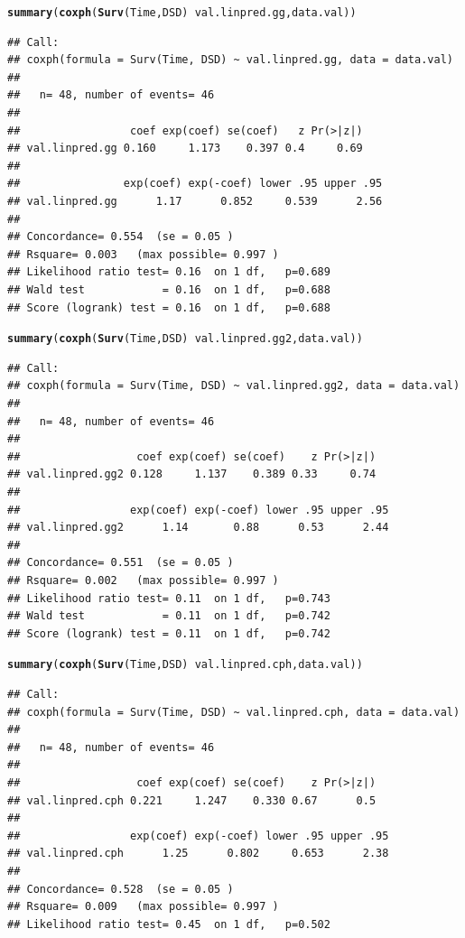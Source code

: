 \documentclass{article}\usepackage[]{graphicx}\usepackage[]{color}
\makeatletter
\newcommand{\hlopt}[1]{\textcolor[rgb]{0,0,0}{#1}}%
\newcommand{\hlstd}[1]{\textcolor[rgb]{0.345,0.345,0.345}{#1}}%
\newcommand{\hlkwd}[1]{\textcolor[rgb]{0.737,0.353,0.396}{\textbf{#1}}}%
\newenvironment{kframe}{%
 \def\at@end@of@kframe{}%
 \ifinner\ifhmode%
  \def\at@end@of@kframe{\end{minipage}}%
  \begin{minipage}{\columnwidth}%
 \fi\fi%
 \def\FrameCommand##1{\hskip\@totalleftmargin \hskip-\fboxsep
 \colorbox{shadecolor}{##1}\hskip-\fboxsep
     \hskip-\linewidth \hskip-\@totalleftmargin \hskip\columnwidth}%
 \MakeFramed {\advance\hsize-\width
   \@totalleftmargin\z@ \linewidth\hsize
   \@setminipage}}%
 {\par\unskip\endMakeFramed%
 \at@end@of@kframe}
\newenvironment{knitrout}{}{} %
\makeatother
\begin{document}
\begin{knitrout}
\begin{kframe}
\begin{alltt}
\hlkwd{summary}\hlstd{(}\hlkwd{coxph}\hlstd{(}\hlkwd{Surv}\hlstd{(Time, DSD)} \hlopt{~} \hlstd{val.linpred.gg, data.val))}
\end{alltt}
\begin{verbatim}
## Call:
## coxph(formula = Surv(Time, DSD) ~ val.linpred.gg, data = data.val)
## 
##   n= 48, number of events= 46 
## 
##                 coef exp(coef) se(coef)   z Pr(>|z|)
## val.linpred.gg 0.160     1.173    0.397 0.4     0.69
## 
##                exp(coef) exp(-coef) lower .95 upper .95
## val.linpred.gg      1.17      0.852     0.539      2.56
## 
## Concordance= 0.554  (se = 0.05 )
## Rsquare= 0.003   (max possible= 0.997 )
## Likelihood ratio test= 0.16  on 1 df,   p=0.689
## Wald test            = 0.16  on 1 df,   p=0.688
## Score (logrank) test = 0.16  on 1 df,   p=0.688
\end{verbatim}
\begin{alltt}
\hlkwd{summary}\hlstd{(}\hlkwd{coxph}\hlstd{(}\hlkwd{Surv}\hlstd{(Time, DSD)} \hlopt{~} \hlstd{val.linpred.gg2, data.val))}
\end{alltt}
\begin{verbatim}
## Call:
## coxph(formula = Surv(Time, DSD) ~ val.linpred.gg2, data = data.val)
## 
##   n= 48, number of events= 46 
## 
##                  coef exp(coef) se(coef)    z Pr(>|z|)
## val.linpred.gg2 0.128     1.137    0.389 0.33     0.74
## 
##                 exp(coef) exp(-coef) lower .95 upper .95
## val.linpred.gg2      1.14       0.88      0.53      2.44
## 
## Concordance= 0.551  (se = 0.05 )
## Rsquare= 0.002   (max possible= 0.997 )
## Likelihood ratio test= 0.11  on 1 df,   p=0.743
## Wald test            = 0.11  on 1 df,   p=0.742
## Score (logrank) test = 0.11  on 1 df,   p=0.742
\end{verbatim}
\begin{alltt}
\hlkwd{summary}\hlstd{(}\hlkwd{coxph}\hlstd{(}\hlkwd{Surv}\hlstd{(Time, DSD)} \hlopt{~} \hlstd{val.linpred.cph, data.val))}
\end{alltt}
\begin{verbatim}
## Call:
## coxph(formula = Surv(Time, DSD) ~ val.linpred.cph, data = data.val)
## 
##   n= 48, number of events= 46 
## 
##                  coef exp(coef) se(coef)    z Pr(>|z|)
## val.linpred.cph 0.221     1.247    0.330 0.67      0.5
## 
##                 exp(coef) exp(-coef) lower .95 upper .95
## val.linpred.cph      1.25      0.802     0.653      2.38
## 
## Concordance= 0.528  (se = 0.05 )
## Rsquare= 0.009   (max possible= 0.997 )
## Likelihood ratio test= 0.45  on 1 df,   p=0.502

\end{verbatim}
\end{kframe}
\end{knitrout}
\end{document}
